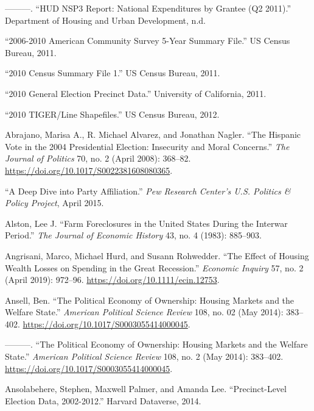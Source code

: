 \documentclass[12pt,oneside]{psthesis}
\begin{document}
\leavevmode\hypertarget{ref-185682011hud}{}%
---------. ``HUD NSP3 Report: National Expenditures by Grantee (Q2 2011).'' Department of Housing and Urban Development, n.d.

\leavevmode\hypertarget{ref-201120062010}{}%
``2006-2010 American Community Survey 5-Year Summary File.'' US Census Bureau, 2011.

\leavevmode\hypertarget{ref-20112010b}{}%
``2010 Census Summary File 1.'' US Census Bureau, 2011.

\leavevmode\hypertarget{ref-20112010}{}%
``2010 General Election Precinct Data.'' University of California, 2011.

\leavevmode\hypertarget{ref-20122010}{}%
``2010 TIGER/Line Shapefiles.'' US Census Bureau, 2012.

\leavevmode\hypertarget{ref-abrajano2008hispanic}{}%
Abrajano, Marisa A., R. Michael Alvarez, and Jonathan Nagler. ``The Hispanic Vote in the 2004 Presidential Election: Insecurity and Moral Concerns.'' \emph{The Journal of Politics} 70, no. 2 (April 2008): 368--82. \url{https://doi.org/10.1017/S0022381608080365}.

\leavevmode\hypertarget{ref-2015deep}{}%
``A Deep Dive into Party Affiliation.'' \emph{Pew Research Center's U.S. Politics \& Policy Project}, April 2015.

\leavevmode\hypertarget{ref-alston1983farm}{}%
Alston, Lee J. ``Farm Foreclosures in the United States During the Interwar Period.'' \emph{The Journal of Economic History} 43, no. 4 (1983): 885--903.

\leavevmode\hypertarget{ref-angrisani2019effect}{}%
Angrisani, Marco, Michael Hurd, and Susann Rohwedder. ``The Effect of Housing Wealth Losses on Spending in the Great Recession.'' \emph{Economic Inquiry} 57, no. 2 (April 2019): 972--96. \url{https://doi.org/10.1111/ecin.12753}.

\leavevmode\hypertarget{ref-ansellPoliticalEconomyOwnership2014}{}%
Ansell, Ben. ``The Political Economy of Ownership: Housing Markets and the Welfare State.'' \emph{American Political Science Review} 108, no. 02 (May 2014): 383--402. \url{https://doi.org/10.1017/S0003055414000045}.

\leavevmode\hypertarget{ref-ansellPoliticalEconomyOwnership2014a}{}%
---------. ``The Political Economy of Ownership: Housing Markets and the Welfare State.'' \emph{American Political Science Review} 108, no. 2 (May 2014): 383--402. \url{https://doi.org/10.1017/S0003055414000045}.

\leavevmode\hypertarget{ref-ansolabehere2014precinctlevel}{}%
Ansolabehere, Stephen, Maxwell Palmer, and Amanda Lee. ``Precinct-Level Election Data, 2002-2012.'' Harvard Dataverse, 2014.
\end{document}
